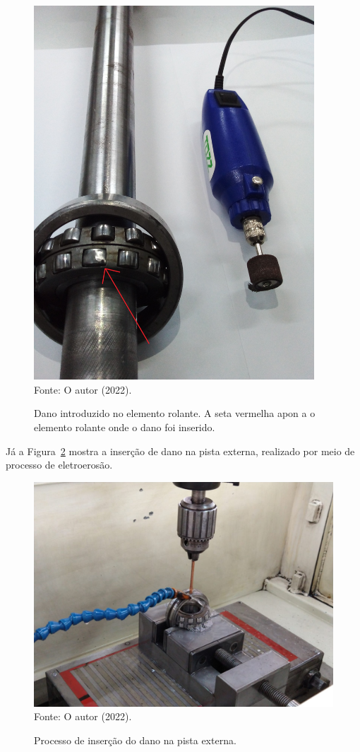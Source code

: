 \documentclass[
	12pt,				
	oneside,			
	a4paper,			
	english,			
	brazil,			
	]{abntex2ppgsi}
\begin{document}
\begin{figure}[H]
\centering
\caption {Dano introduzido no elemento rolante. A seta vermelha apon
a o elemento rolante onde o dano foi inserido.}
\includegraphics[width=\textwidth,height=140mm,keepaspectratio]{dano_introduzido_rolante} \\
Fonte: O autor (2022).
\label{dano_introduzido_rolante}
\end{figure}

Já a Figura~\ref{insercao_dano_pista_externa} mostra a inserção de dano na pista externa, realizado por meio de processo de eletroerosão.

\begin{figure}[H]
\centering
\caption {Processo de inserção do dano na pista externa.}
\includegraphics[width=\textwidth,keepaspectratio]{insercao_dano_pista_externa} \\
Fonte: O autor (2022).
\label{insercao_dano_pista_externa}
\end{figure}
\end{document}
